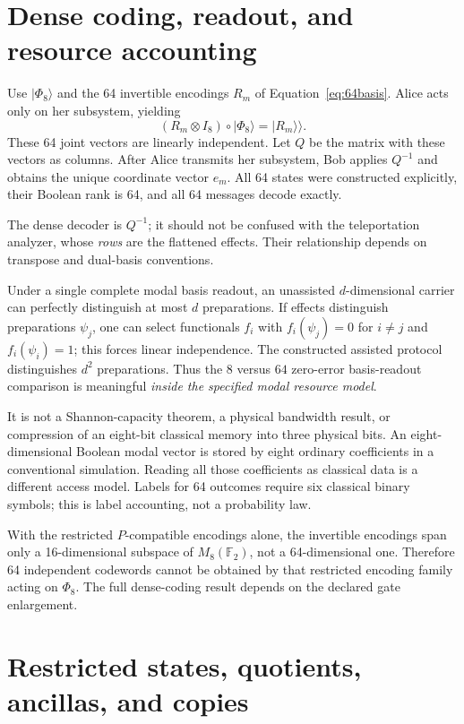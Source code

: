 \documentclass[11pt,a4paper]{article}
\theoremstyle{definition}\newtheorem{definition}[theorem]{Definition}
\newcommand{\F}{\mathbb F_2}
\newcommand{\ket}[1]{\lvert #1\rangle}
\begin{document}
\section{Dense coding, readout, and resource accounting}
Use $\ket{\Phi_8}$ and the 64 invertible encodings $R_m$ of Equation~\eqref{eq:64basis}. Alice acts only on her subsystem, yielding
\[
 (R_m\otimes I_8)\circ\ket{\Phi_8}=\ket{R_m}\!\rangle.
\]
These 64 joint vectors are linearly independent. Let $Q$ be the matrix with these vectors as columns. After Alice transmits her subsystem, Bob applies $Q^{-1}$ and obtains the unique coordinate vector $e_m$. All 64 states were constructed explicitly, their Boolean rank is 64, and all 64 messages decode exactly.

The dense decoder is $Q^{-1}$; it should not be confused with the teleportation analyzer, whose \emph{rows} are the flattened effects. Their relationship depends on transpose and dual-basis conventions.

Under a single complete modal basis readout, an unassisted $d$-dimensional carrier can perfectly distinguish at most $d$ preparations. If effects distinguish preparations $\psi_j$, one can select functionals $f_i$ with $f_i(\psi_j)=0$ for $i\ne j$ and $f_i(\psi_i)=1$; this forces linear independence. The constructed assisted protocol distinguishes $d^2$ preparations. Thus the $8$ versus $64$ zero-error basis-readout comparison is meaningful \emph{inside the specified modal resource model}.

It is not a Shannon-capacity theorem, a physical bandwidth result, or compression of an eight-bit classical memory into three physical bits. An eight-dimensional Boolean modal vector is stored by eight ordinary coefficients in a conventional simulation. Reading all those coefficients as classical data is a different access model. Labels for 64 outcomes require six classical binary symbols; this is label accounting, not a probability law.

With the restricted $P$-compatible encodings alone, the invertible encodings span only a 16-dimensional subspace of $M_8(\F)$, not a 64-dimensional one. Therefore 64 independent codewords cannot be obtained by that restricted encoding family acting on $\Phi_8$. The full dense-coding result depends on the declared gate enlargement.

\section{Restricted states, quotients, ancillas, and copies}
\end{document}
